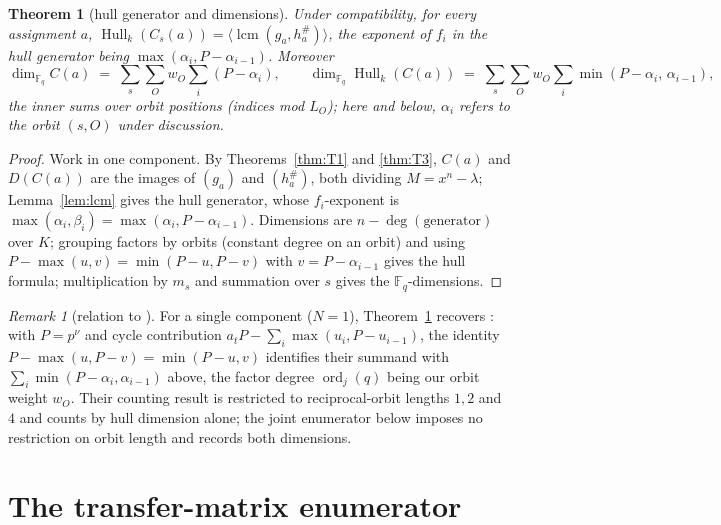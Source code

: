 \documentclass[11pt]{article}
\newtheorem{theorem}{Theorem}[section]
\theoremstyle{definition}
\theoremstyle{remark}
\newtheorem*{remark}{Remark}
\newcommand{\Fq}{\mathbb{F}_q}
\newcommand{\Hull}{\operatorname{Hull}}
\newcommand{\lcm}{\operatorname{lcm}}
\begin{document}
\begin{theorem}[hull generator and dimensions]\label{thm:T4}
Under compatibility, for every assignment \(a\),
\(\Hull_k(C_s(a)) = \langle \lcm(g_a, h_a^{\#}) \rangle\), the exponent
of \(f_i\) in the hull generator being \(\max(\alpha_i, P-\alpha_{i-1})\).
Moreover
\[
\dim_{\Fq} C(a) \;=\; \sum_{s} \sum_{O} w_O \sum_{i} (P - \alpha_i),
\qquad
\dim_{\Fq} \Hull_k(C(a)) \;=\; \sum_{s} \sum_{O} w_O \sum_i
\min(P-\alpha_i,\, \alpha_{i-1}),
\]
the inner sums over orbit positions (indices mod \(L_O\)); here and
below, \(\alpha_i\) refers to the orbit \((s,O)\) under discussion.
\end{theorem}

\begin{proof}
Work in one component. By Theorems~\ref{thm:T1} and \ref{thm:T3},
\(C(a)\) and \(D(C(a))\) are the images of \((g_a)\) and
\((h_a^{\#})\), both dividing \(M = x^n-\lambda\); Lemma~\ref{lem:lcm}
gives the hull generator, whose \(f_i\)-exponent is
\(\max(\alpha_i, \beta_i) = \max(\alpha_i, P-\alpha_{i-1})\). Dimensions
are \(n - \deg(\text{generator})\) over \(K\); grouping factors by
orbits (constant degree on an orbit) and using
\(P - \max(u,v) = \min(P-u, P-v)\) with \(v = P-\alpha_{i-1}\) gives the
hull formula; multiplication by \(m_s\) and summation over \(s\) gives
the \(\Fq\)-dimensions.
\end{proof}

\begin{remark}[relation to \cite{DPI2023}]
For a single component (\(N = 1\)), Theorem~\ref{thm:T4} recovers
\cite[Theorem~3]{DPI2023}: with \(P = p^{\nu}\) and cycle contribution
\(a_t P - \sum_i \max(u_i, P - u_{i-1})\), the identity
\(P - \max(u, P - v) = \min(P - u, v)\) identifies their summand with
\(\sum_i \min(P - \alpha_i, \alpha_{i-1})\) above, the factor degree
\(\operatorname{ord}_j(q)\) being our orbit weight \(w_O\). Their
counting result \cite[Theorem~4]{DPI2023} is restricted to
reciprocal-orbit lengths \(1, 2\) and \(4\) and counts by hull
dimension alone; the joint enumerator below imposes no restriction on
orbit length and records both dimensions.
\end{remark}

\section{The transfer-matrix enumerator}\label{sec:enumerator}
\end{document}
